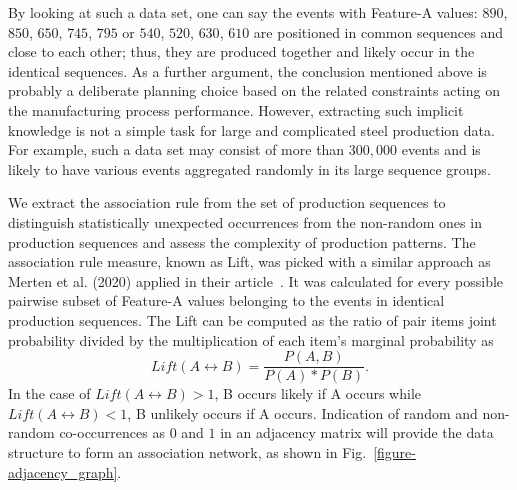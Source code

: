 By looking at such a data set, one can say the events with Feature-A values: $890$, $850$, $650$, $745$, $795$ or $540$, $520$, $630$, $610$ are positioned in common sequences and close to each other; thus, they are produced together and likely occur in the identical sequences. As a further argument, the conclusion mentioned above is probably a deliberate planning choice based on the related constraints acting on the manufacturing process performance. However, extracting such implicit knowledge is not a simple task for large and complicated steel production data. For example, such a data set may consist of more than $300,000$ events and is likely to have various events aggregated randomly in its large sequence groups.

We extract the association rule from the set of production sequences to distinguish statistically unexpected occurrences from the non-random ones in production sequences and assess the complexity of production patterns. The association rule measure, known as Lift, was picked with a similar approach as Merten et al. (2020) applied in their article~\cite{MERTEN2020}. It was calculated for every possible pairwise subset of Feature-A values belonging to the events in identical production sequences. The Lift can be computed as the ratio of pair items joint probability divided by the multiplication of each item's marginal probability as
\begin{equation} %
	Lift(A\leftrightarrow B)=\frac{P(A,B)}{P(A)*P(B)}.
	\label{lift}
\end{equation}
In the case of $Lift(A\leftrightarrow B)> 1$, B occurs likely if A occurs while $Lift(A\leftrightarrow B)< 1$, B unlikely occurs if A occurs. Indication of random and non-random co-occurrences as $0$ and $1$ in an adjacency matrix will provide the data structure to form an association network, as shown in Fig.~\ref{figure-adjacency_graph}.

